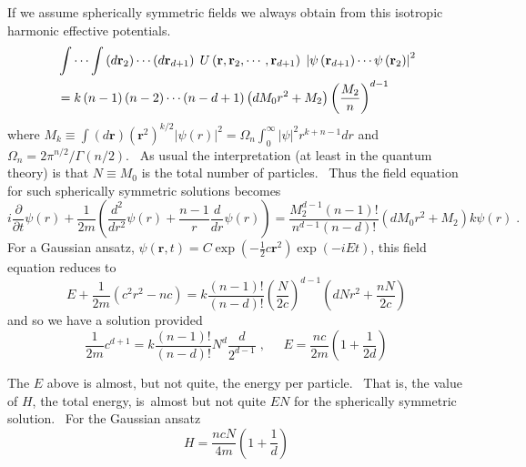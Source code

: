 \documentclass[a4paper,12pt]{article}%
\begin{document}
If we assume spherically symmetric fields we always obtain from this isotropic
harmonic effective potentials.
\begin{align*}
&  \idotsint\left(  d\mathbf{r}_{2}\right)  \cdots\left(  d\mathbf{r}%
_{d+1}\right)  \;U\left(  \mathbf{r},\mathbf{r}_{2},\cdots,\mathbf{r}%
_{d+1}\right)  \;\left|  \psi\left(  \mathbf{r}_{d+1}\right)  \cdots
\psi\left(  \mathbf{r}_{2}\right)  \right|  ^{2}\\
&  =k\left(  n-1\right)  \left(  n-2\right)  \cdots\left(  n-d+1\right)
\left(  dM_{0}r^{2}+M_{2}\right)  \left(  \frac{M_{2}}{n}\right)  ^{d-1}%
\end{align*}
where $M_{k}\equiv\int\left(  d\mathbf{r}\right)  \left(  \mathbf{r}%
^{2}\right)  ^{k/2}\left|  \psi\left(  r\right)  \right|  ^{2}=\Omega_{n}%
\int_{0}^{\infty}\left|  \psi\right|  ^{2}r^{k+n-1}dr$ and $\Omega_{n}%
=2\pi^{n/2}/\Gamma\left(  n/2\right)  $. \ As usual the interpretation (at
least in the quantum theory) is that $N\equiv M_{0}$ is the total number of
particles. \ Thus the field equation for such spherically symmetric solutions
becomes
\[
i\frac{\partial}{\partial t}\psi\left(  r\right)  +\frac{1}{2m}\left(
\frac{d^{2}}{dr^{2}}\psi\left(  r\right)  +\frac{n-1}{r}\frac{d}{dr}%
\psi\left(  r\right)  \right)  =\frac{M_{2}^{d-1}\left(  n-1\right)
!}{n^{d-1}\left(  n-d\right)  !}\left(  dM_{0}r^{2}+M_{2}\right)  k\psi\left(
r\right)  \;.
\]
For a Gaussian ansatz, $\psi\left(  \mathbf{r},t\right)  =C\exp\left(
-\frac{1}{2}c\mathbf{r}^{2}\right)  \exp\left(  -iEt\right)  $, this field
equation reduces to
\[
E+\frac{1}{2m}\left(  c^{2}r^{2}-nc\right)  =k\frac{\left(  n-1\right)
!}{\left(  n-d\right)  !}\left(  \frac{N}{2c}\right)  ^{d-1}\left(
dNr^{2}+\frac{nN}{2c}\right)
\]
and so we have a solution provided
\[
\frac{1}{2m}c^{d+1}=k\frac{\left(  n-1\right)  !}{\left(  n-d\right)  !}%
N^{d}\frac{d}{2^{d-1}}\;,\;\;\;\;\;E=\frac{nc}{2m}\left(  1+\frac{1}%
{2d}\right)
\]

The $E$ above is almost, but not quite, the energy per particle. \ That is,
the value of $H$, the total energy, is\ almost but not quite $EN$ for the
spherically symmetric solution. \ For the Gaussian ansatz%
\[
H=\frac{ncN}{4m}\left(  1+\frac{1}{d}\right)
\]
\end{document}
